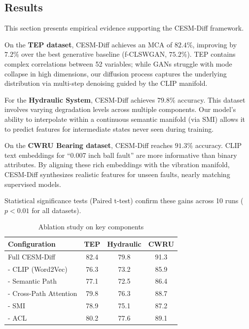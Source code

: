 \documentclass[journal]{IEEEtran}
\begin{document}
\subsection{Results}
This section presents empirical evidence supporting the CESM-Diff framework.

On the \textbf{TEP dataset}, CESM-Diff achieves an MCA of $82.4\%$, improving by $7.2\%$ over the best generative baseline (f-CLSWGAN, $75.2\%$). TEP contains complex correlations between 52 variables; while GANs struggle with mode collapse in high dimensions, our diffusion process captures the underlying distribution via multi-step denoising guided by the CLIP manifold.

For the \textbf{Hydraulic System}, CESM-Diff achieves $79.8\%$ accuracy. This dataset involves varying degradation levels across multiple components. Our model's ability to interpolate within a continuous semantic manifold (via SMI) allows it to predict features for intermediate states never seen during training.

On the \textbf{CWRU Bearing dataset}, CESM-Diff reaches $91.3\%$ accuracy. CLIP text embeddings for ``0.007 inch ball fault'' are more informative than binary attributes. By aligning these rich embeddings with the vibration manifold, CESM-Diff synthesizes realistic features for unseen faults, nearly matching supervised models.

Statistical significance tests (Paired t-test) confirm these gains across 10 runs ($p < 0.01$ for all datasets).

\begin{table}[htbp]
\caption{Ablation study on key components}
\label{tab:ablation}
\begin{center}
\begin{tabular}{lccc}
\hline
Configuration & TEP & Hydraulic & CWRU \\
\hline
Full CESM-Diff & 82.4 & 79.8 & 91.3 \\
- CLIP (Word2Vec) & 76.3 & 73.2 & 85.9 \\
- Semantic Path & 77.1 & 72.5 & 86.4 \\
- Cross-Path Attention & 79.8 & 76.3 & 88.7 \\
- SMI & 78.9 & 75.1 & 87.2 \\
- ACL & 80.2 & 77.6 & 89.1 \\
\hline
\end{tabular}
\end{center}
\end{table}
\end{document}
